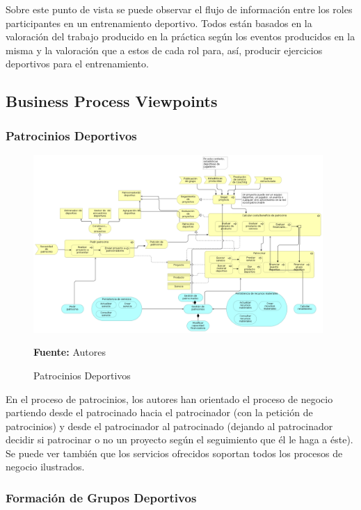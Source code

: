 Sobre este punto de vista se puede observar el flujo de información entre los roles participantes en un entrenamiento deportivo. Todos están basados en la valoración del trabajo producido en la práctica según los eventos producidos en la misma y la valoración que a estos de cada rol para, así, producir ejercicios deportivos para el entrenamiento.

\subsection{Business Process Viewpoints}

\subsubsection{Patrocinios Deportivos}

\begin{figure}[!htb]
  \begin{center}
    \includegraphics[width=11cm]{./imagenes/business_process/patrociniosdeportivos.png}
    \caption{Patrocinios Deportivos}
    \label{fig:bp_patrocinios_deportivos}
    \textbf{Fuente:}  Autores
  \end{center}
\end{figure}

En el proceso de patrocinios, los autores han orientado el proceso de negocio partiendo desde el patrocinado hacia el patrocinador (con la petición de patrocinios) y desde el patrocinador al patrocinado (dejando al patrocinador decidir si patrocinar o no un proyecto según el seguimiento que él le haga a éste). Se puede ver también que los servicios ofrecidos soportan todos los procesos de negocio ilustrados.

\subsubsection{Formación de Grupos Deportivos}

